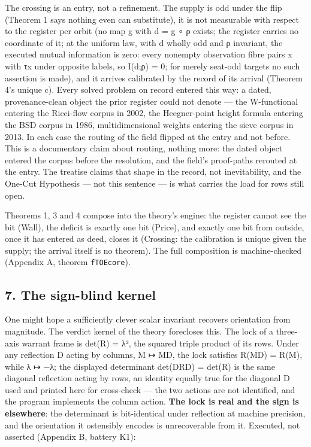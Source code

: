 \documentclass[10pt]{article}
\renewcommand{\_}{\origunderscore\allowbreak}
\begin{document}
The crossing is an entry, not a refinement. The supply is odd under the
flip (Theorem 1 says nothing even can substitute), it is not measurable
with respect to the register per orbit (no map g with d = g ∘ ρ exists;
the register carries no coordinate of it; at the uniform law, with d
wholly odd and ρ invariant, the executed mutual information is zero:
every nonempty observation fibre pairs x with τx under opposite labels,
so I(d;ρ) = 0; for merely seat-odd targets no such assertion is made),
and it arrives calibrated by the record of its arrival (Theorem 4's
unique c). Every solved problem on record entered this way: a dated,
provenance-clean object the prior register could not denote --- the
W-functional entering the Ricci-flow corpus in 2002, the Heegner-point
height formula entering the BSD corpus in 1986, multidimensional weights
entering the sieve corpus in 2013. In each case the routing of the field
flipped at the entry and not before. This is a documentary claim about
routing, nothing more: the dated object entered the corpus before the
resolution, and the field's proof-paths rerouted at the entry. The
treatise claims that shape in the record, not inevitability, and the
One-Cut Hypothesis --- not this sentence --- is what carries the load
for rows still open.

Theorems 1, 3 and 4 compose into the theory's engine: the register
cannot see the bit (Wall), the deficit is exactly one bit (Price), and
exactly one bit from outside, once it has entered as deed, closes it
(Crossing: the calibration is unique given the supply; the arrival
itself is no theorem). The full composition is machine-checked (Appendix
A, theorem \texttt{fTOE\_core}).

\hypertarget{the-sign-blind-kernel}{%
\subsection{7. The sign-blind kernel}\label{the-sign-blind-kernel}}

One might hope a sufficiently clever scalar invariant recovers
orientation from magnitude. The verdict kernel of the theory forecloses
this. The lock of a three-axis warrant frame is det(R) = λ², the squared
triple product of its rows. Under any reflection D acting by columns, M
↦ MD, the lock satisfies R(MD) = R(M), while λ ↦ −λ; the displayed
determinant det(DRD) = det(R) is the same diagonal reflection acting by
rows, an identity equally true for the diagonal D used and printed here
for cross-check --- the two actions are not identified, and the program
implements the column action. \textbf{The lock is real and the sign is
elsewhere}: the determinant is bit-identical under reflection at machine
precision, and the orientation it ostensibly encodes is unrecoverable
from it. Executed, not asserted (Appendix B, battery K1):
\end{document}
